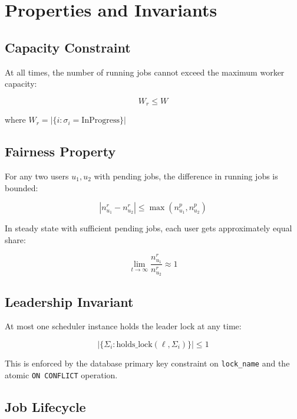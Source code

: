 \documentclass[11pt]{article}
\begin{document}
\section{Properties and Invariants}

\subsection{Capacity Constraint}

At all times, the number of running jobs cannot exceed the maximum worker capacity:

\begin{equation}
W_r \leq W
\end{equation}

where $W_r = |\{i : \sigma_i = \text{InProgress}\}|$

\subsection{Fairness Property}

For any two users $u_1, u_2$ with pending jobs, the difference in running jobs is bounded:

\begin{equation}
|n_{u_1}^r - n_{u_2}^r| \leq \max(n_{u_1}^p, n_{u_2}^p)
\end{equation}

In steady state with sufficient pending jobs, each user gets approximately equal share:

\begin{equation}
\lim_{t \to \infty} \frac{n_{u_1}^r}{n_{u_2}^r} \approx 1
\end{equation}

\subsection{Leadership Invariant}

At most one scheduler instance holds the leader lock at any time:

\begin{equation}
|\{\Sigma_i : \text{holds\_lock}(\ell, \Sigma_i)\}| \leq 1
\end{equation}

This is enforced by the database primary key constraint on \texttt{lock\_name} and the atomic \texttt{ON CONFLICT} operation.

\subsection{Job Lifecycle}
\end{document}
